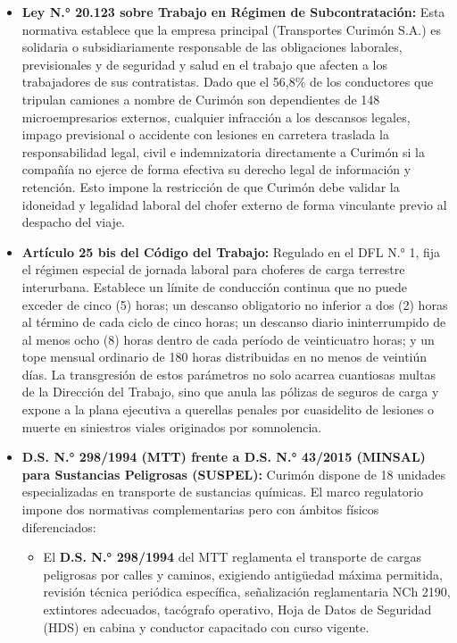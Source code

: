 \begin{itemize}
  \item \textbf{Ley N.° 20.123 sobre Trabajo en Régimen de Subcontratación:} Esta normativa establece que la empresa principal (Transportes Curimón S.A.) es solidaria o subsidiariamente responsable de las obligaciones laborales, previsionales y de seguridad y salud en el trabajo que afecten a los trabajadores de sus contratistas. Dado que el 56,8\% de los conductores que tripulan camiones a nombre de Curimón son dependientes de 148 microempresarios externos, cualquier infracción a los descansos legales, impago previsional o accidente con lesiones en carretera traslada la responsabilidad legal, civil e indemnizatoria directamente a Curimón si la compañía no ejerce de forma efectiva su derecho legal de información y retención. Esto impone la restricción de que Curimón debe validar la idoneidad y legalidad laboral del chofer externo de forma vinculante previo al despacho del viaje.
  \item \textbf{Artículo 25 bis del Código del Trabajo:} Regulado en el DFL N.° 1, fija el régimen especial de jornada laboral para choferes de carga terrestre interurbana. Establece un límite de conducción continua que no puede exceder de cinco (5) horas; un descanso obligatorio no inferior a dos (2) horas al término de cada ciclo de cinco horas; un descanso diario ininterrumpido de al menos ocho (8) horas dentro de cada período de veinticuatro horas; y un tope mensual ordinario de 180 horas distribuidas en no menos de veintiún días. La transgresión de estos parámetros no solo acarrea cuantiosas multas de la Dirección del Trabajo, sino que anula las pólizas de seguros de carga y expone a la plana ejecutiva a querellas penales por cuasidelito de lesiones o muerte en siniestros viales originados por somnolencia.
  \item \textbf{D.S. N.° 298/1994 (MTT) frente a D.S. N.° 43/2015 (MINSAL) para Sustancias Peligrosas (SUSPEL):} Curimón dispone de 18 unidades especializadas en transporte de sustancias químicas. El marco regulatorio impone dos normativas complementarias pero con ámbitos físicos diferenciados:
  \begin{itemize}
    \item El \textbf{D.S. N.° 298/1994} del MTT reglamenta el transporte de cargas peligrosas por calles y caminos, exigiendo antigüedad máxima permitida, revisión técnica periódica específica, señalización reglamentaria NCh 2190, extintores adecuados, tacógrafo operativo, Hoja de Datos de Seguridad (HDS) en cabina y conductor capacitado con curso vigente.

\end{itemize}
\end{itemize}
